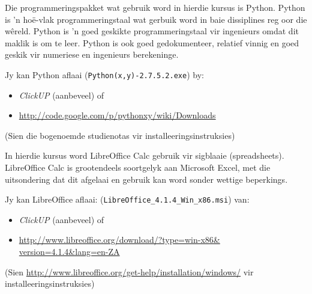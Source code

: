 	Die programmeringspakket wat gebruik word in hierdie kursus is
        Python.  Python is 'n ho\"{e}-vlak programmeringstaal wat
        gerbuik word in baie dissiplines reg oor die
        w\^{e}reld. Python is 'n goed geskikte programmeringstaal vir
        ingenieurs omdat dit maklik is om te leer.  Python is ook goed
        gedokumenteer, relatief vinnig en goed geskik vir numeriese en
        ingenieurs berekeninge.
        
        Jy kan Python aflaai ({\tt Python(x,y)-2.7.5.2.exe}) by:
        \begin{itemize}
            \item \textit{ClickUP} (aanbeveel) of
            \item \url{http://code.google.com/p/pythonxy/wiki/Downloads}
        \end{itemize}
        (Sien die bogenoemde studienotas vir installeeringsinstruksies)

	In hierdie kursus word LibreOffice Calc gebruik vir sigblaaie (spreadsheets).
	LibreOffice Calc is grootendeels soortgelyk aan Microsoft Excel, met die
	uitsondering dat dit afgelaai en gebruik kan word sonder wettige
	beperkings.
        
        Jy kan LibreOffice aflaai:
        ({\tt  LibreOffice\_4.1.4\_Win\_x86.msi}) van:
        \begin{itemize}
            \item \textit{ClickUP} (aanbeveel) of
            \item \url{http://www.libreoffice.org/download/?type=win-x86&
                       version=4.1.4&lang=en-ZA}
        \end{itemize}
        (Sien \url{http://www.libreoffice.org/get-help/installation/windows/} vir 
        installeeringsinstruksies)

